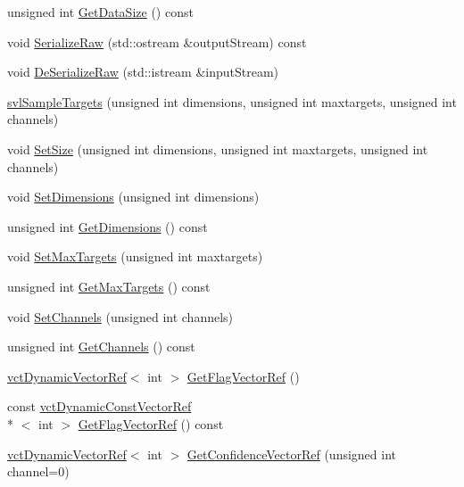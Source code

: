 \begin{DoxyCompactItemize}
unsigned int \hyperlink{classsvl_sample_targets_afc39b94054a5db5abb77182fa378c929}{Get\-Data\-Size} () const 
\item 
void \hyperlink{classsvl_sample_targets_a15e6b8cb327bdf2f9a4494d9a243e555}{Serialize\-Raw} (std\-::ostream \&output\-Stream) const 
\item 
void \hyperlink{classsvl_sample_targets_ac943c12c7fe9bd4c0cb6f4c155efb6ae}{De\-Serialize\-Raw} (std\-::istream \&input\-Stream)
\item 
\hyperlink{classsvl_sample_targets_a69de7b7432d5314fc11d898ab02f4046}{svl\-Sample\-Targets} (unsigned int dimensions, unsigned int maxtargets, unsigned int channels)
\item 
void \hyperlink{classsvl_sample_targets_a3692b97551225c23ad7b7e18efb4d236}{Set\-Size} (unsigned int dimensions, unsigned int maxtargets, unsigned int channels)
\item 
void \hyperlink{classsvl_sample_targets_af231cc042f722d534b8804affae6a354}{Set\-Dimensions} (unsigned int dimensions)
\item 
unsigned int \hyperlink{classsvl_sample_targets_aea04d136be65cd19f9321435d8a6f7f6}{Get\-Dimensions} () const 
\item 
void \hyperlink{classsvl_sample_targets_a58abe414b88508b7d5a92b57d1d374d0}{Set\-Max\-Targets} (unsigned int maxtargets)
\item 
unsigned int \hyperlink{classsvl_sample_targets_a20a7dd519c8cd41d9e627d32d1c65403}{Get\-Max\-Targets} () const 
\item 
void \hyperlink{classsvl_sample_targets_ae24efb533f1c2459a2d3aaf9d4ecd83b}{Set\-Channels} (unsigned int channels)
\item 
unsigned int \hyperlink{classsvl_sample_targets_a0903ed0823d8e2cb2d12ae3a3b75ec98}{Get\-Channels} () const 
\item 
\hyperlink{classvct_dynamic_vector_ref}{vct\-Dynamic\-Vector\-Ref}$<$ int $>$ \hyperlink{classsvl_sample_targets_aff5519cd08478348ddeafac54749aaa8}{Get\-Flag\-Vector\-Ref} ()
\item 
const \hyperlink{classvct_dynamic_const_vector_ref}{vct\-Dynamic\-Const\-Vector\-Ref}\\*
$<$ int $>$ \hyperlink{classsvl_sample_targets_a93c79ce53cd465de8f84a2469aa3656f}{Get\-Flag\-Vector\-Ref} () const 
\item 
\hyperlink{classvct_dynamic_vector_ref}{vct\-Dynamic\-Vector\-Ref}$<$ int $>$ \hyperlink{classsvl_sample_targets_a6577ff0a1e3529341d2a366d8c0a3339}{Get\-Confidence\-Vector\-Ref} (unsigned int channel=0)

\end{DoxyCompactItemize}
